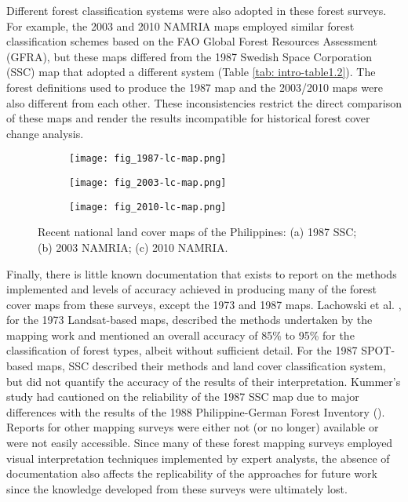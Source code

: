 Different forest classification systems were also adopted in these forest surveys. For example, the 2003 and 2010 NAMRIA maps employed similar forest classification schemes based on the FAO Global Forest Resources Assessment (GFRA), but these maps differed from the 1987 Swedish Space Corporation (SSC) map that adopted a different system (Table \ref{tab: intro-table1.2}). The forest definitions used to produce the 1987 map and the 2003/2010 maps were also different from each other. These inconsistencies restrict the direct comparison of these maps and render the results incompatible for historical forest cover change analysis.\\

\begin{figure}[!ht] \centering
	\captionsetup[subfigure]{width=2.0in} %
	\begin{subfigure}[t]{0.32\textwidth}
		\texttt{[image: fig\_1987-lc-map.png]}
		\caption[SSC/NAMRIA land cover maps.]{}
		\label{fig: intro-fig1.1a}
	\end{subfigure}
	\begin{subfigure}[t]{0.32\textwidth}
		\texttt{[image: fig\_2003-lc-map.png]}
		\caption[SSC/NAMRIA land cover maps.]{}
		\label{fig: intro-fig1.1b}
	\end{subfigure}
	\begin{subfigure}[t]{0.32\textwidth}
		\texttt{[image: fig\_2010-lc-map.png]}
		\caption[SSC/NAMRIA land cover maps.]{}
		\label{fig: intro-fig1.1c}
	\end{subfigure}
	\caption[Recent national land cover maps of the Philippines: (a) 1987 SSC; (b) 2003 NAMRIA; (c) 2010 NAMRIA.]{Recent national land cover maps of the Philippines: (a) 1987 SSC; (b) 2003 NAMRIA; (c) 2010 NAMRIA.}
	\label{fig: intro-fig1.1}
\end{figure}

Finally, there is little known documentation that exists to report on the methods implemented and levels of accuracy achieved in producing many of the forest cover maps from these surveys, except the 1973 and 1987 maps. Lachowski et al. \citeyearpar{lachowski_landsat_1979}, for the 1973 Landsat-based maps, described the methods undertaken by the mapping work and mentioned an overall accuracy of 85\% to 95\% for the classification of forest types, albeit without sufficient detail. For the 1987 SPOT-based maps, SSC \cite{swedish_space_corporation_mapping_1988} described their methods and land cover classification system, but did not quantify the accuracy of the results of their interpretation. Kummer's study had cautioned on the reliability of the 1987 SSC map due to major differences with the results of the 1988 Philippine-German Forest Inventory (\cite{kummer_remote_1992}). Reports for other mapping surveys were either not (or no longer) available or were not easily accessible. Since many of these forest mapping surveys employed visual interpretation techniques implemented by expert analysts, the absence of documentation also affects the replicability of the approaches for future work since the knowledge developed from these surveys were ultimately lost.
